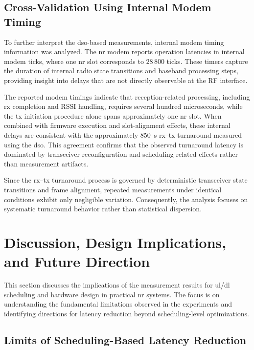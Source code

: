 \documentclass[conference]{IEEEtran}
\begin{document}
\subsection{Cross-Validation Using Internal Modem Timing}

To further interpret the \gls{dso}-based measurements, internal modem timing information was analyzed. The \gls{nr} modem reports operation latencies in internal modem ticks, where one \gls{nr} slot corresponds to 28\,800 ticks. These timers capture the duration of internal radio state transitions and baseband processing steps, providing insight into delays that are not directly observable at the RF interface.

The reported modem timings indicate that reception-related processing, including \gls{rx} completion and RSSI handling, requires several hundred microseconds, while the \gls{tx} initiation procedure alone spans approximately one \gls{nr} slot. When combined with firmware execution and slot-alignment effects, these internal delays are consistent with the approximately 850~\textmu s \gls{rx}--\gls{tx} turnaround measured using the \gls{dso}. This agreement confirms that the observed turnaround latency is dominated by transceiver reconfiguration and scheduling-related effects rather than measurement artifacts.

Since the \gls{rx}--\gls{tx} turnaround process is governed by deterministic transceiver state transitions and frame alignment, repeated measurements under identical conditions exhibit only negligible variation. Consequently, the analysis focuses on systematic turnaround behavior rather than statistical dispersion.


\section{Discussion, Design Implications, and Future Direction}

This section discusses the implications of the measurement results for \gls{ul}/\gls{dl} scheduling and hardware design in practical \gls{nr} systems. The focus is on understanding the fundamental limitations observed in the experiments and identifying directions for latency reduction beyond scheduling-level optimizations.

\subsection{Limits of Scheduling-Based Latency Reduction}
\end{document}
